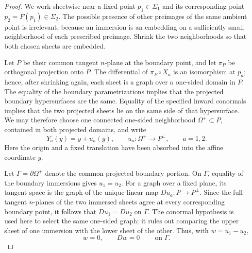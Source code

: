 \documentclass[11pt,a4paper]{article}
\numberwithin{equation}{section}
\begin{document}
\begin{proof}
We work sheetwise near a fixed point $p_1\in\Sigma_1$ and its corresponding
point $p_2=F(p_1)\in\Sigma_2$.  The possible presence of other preimages of
the same ambient point is irrelevant, because an immersion is an embedding on
a sufficiently small neighborhood of each prescribed preimage.  Shrink the
two neighborhoods so that both chosen sheets are embedded.

Let $P$ be their common tangent $n$-plane at the boundary point, and let
$\pi_P$ be orthogonal projection onto $P$.  The differential of
$\pi_P\circ X_a$ is an isomorphism at $p_a$; hence, after shrinking again,
each sheet is a graph over a one-sided domain in $P$.  The equality of the
boundary parametrizations implies that the projected boundary hypersurfaces
are the same.  Equality of the specified inward conormals implies that the two
projected sheets lie on the same side of that hypersurface.  We may therefore
choose one connected one-sided neighborhood $\Omega^+\subset P$, contained in
both projected domains, and write
\begin{equation}
        Y_a(y)=y+u_a(y),
        \qquad
        u_a:\Omega^+\longrightarrow P^\perp,
        \qquad a=1,2.
\end{equation}
Here the origin and a fixed translation have been absorbed into the affine
coordinate $y$.

Let $\Gamma=\partial\Omega^+$ denote the common projected boundary portion.
On $\Gamma$, equality of the boundary immersions gives $u_1=u_2$.  For a graph
over a fixed plane, its tangent space is the graph of the unique linear map
$Du_a:P\to P^\perp$.  Since the full tangent $n$-planes of the two immersed
sheets agree at every corresponding boundary point, it follows that
$Du_1=Du_2$ on $\Gamma$.  The conormal hypothesis is used here to select the
same one-sided graph; it rules out comparing the upper sheet of one immersion
with the lower sheet of the other.  Thus, with $w=u_1-u_2$,
\begin{equation}
        w=0,
        \qquad
        Dw=0
        \qquad\ \text{on }\Gamma.
\end{equation}


\end{proof}
\end{document}
